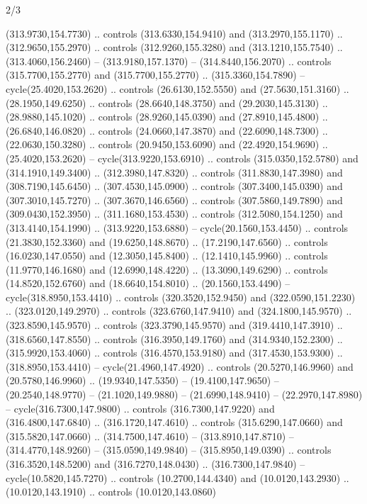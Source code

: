 \begin{flagdescription}{2/3}
\begin{scope}[xshift=0.5\flaglength,yshift=0.5\flagwidth,scale=\stretchfactor]
\begin{scope}[scale=0.001645\flagwidth,yshift=65mm,xshift=-63mm]
\begin{scope}[y=0.80pt, x=0.80pt, yscale=-1,]
\begin{scope}[cm={{1.33333,0.0,0.0,1.33333,(0.0,1e-05)}}]
  (313.9730,154.7730) .. controls (313.6330,154.9410) and (313.2970,155.1170) ..
  (312.9650,155.2970) .. controls (312.9260,155.3280) and (313.1210,155.7540) ..
  (313.4060,156.2460) -- (313.9180,157.1370) -- (314.8440,156.2070) .. controls
  (315.7700,155.2770) and (315.7700,155.2770) .. (315.3360,154.7890) --
  cycle(25.4020,153.2620) .. controls (26.6130,152.5550) and (27.5630,151.3160)
  .. (28.1950,149.6250) .. controls (28.6640,148.3750) and (29.2030,145.3130) ..
  (28.9880,145.1020) .. controls (28.9260,145.0390) and (27.8910,145.4800) ..
  (26.6840,146.0820) .. controls (24.0660,147.3870) and (22.6090,148.7300) ..
  (22.0630,150.3280) .. controls (20.9450,153.6090) and (22.4920,154.9690) ..
  (25.4020,153.2620) -- cycle(313.9220,153.6910) .. controls (315.0350,152.5780)
  and (314.1910,149.3400) .. (312.3980,147.8320) .. controls (311.8830,147.3980)
  and (308.7190,145.6450) .. (307.4530,145.0900) .. controls (307.3400,145.0390)
  and (307.3010,145.7270) .. (307.3670,146.6560) .. controls (307.5860,149.7890)
  and (309.0430,152.3950) .. (311.1680,153.4530) .. controls (312.5080,154.1250)
  and (313.4140,154.1990) .. (313.9220,153.6880) -- cycle(20.1560,153.4450) ..
  controls (21.3830,152.3360) and (19.6250,148.8670) .. (17.2190,147.6560) ..
  controls (16.0230,147.0550) and (12.3050,145.8400) .. (12.1410,145.9960) ..
  controls (11.9770,146.1680) and (12.6990,148.4220) .. (13.3090,149.6290) ..
  controls (14.8520,152.6760) and (18.6640,154.8010) .. (20.1560,153.4490) --
  cycle(318.8950,153.4410) .. controls (320.3520,152.9450) and
  (322.0590,151.2230) .. (323.0120,149.2970) .. controls (323.6760,147.9410) and
  (324.1800,145.9570) .. (323.8590,145.9570) .. controls (323.3790,145.9570) and
  (319.4410,147.3910) .. (318.6560,147.8550) .. controls (316.3950,149.1760) and
  (314.9340,152.2300) .. (315.9920,153.4060) .. controls (316.4570,153.9180) and
  (317.4530,153.9300) .. (318.8950,153.4410) -- cycle(21.4960,147.4920) ..
  controls (20.5270,146.9960) and (20.5780,146.9960) .. (19.9340,147.5350) --
  (19.4100,147.9650) -- (20.2540,148.9770) -- (21.1020,149.9880) --
  (21.6990,148.9410) -- (22.2970,147.8980) -- cycle(316.7300,147.9800) ..
  controls (316.7300,147.9220) and (316.4800,147.6840) .. (316.1720,147.4610) ..
  controls (315.6290,147.0660) and (315.5820,147.0660) .. (314.7500,147.4610) --
  (313.8910,147.8710) -- (314.4770,148.9260) -- (315.0590,149.9840) --
  (315.8950,149.0390) .. controls (316.3520,148.5200) and (316.7270,148.0430) ..
  (316.7300,147.9840) -- cycle(10.5820,145.7270) .. controls (10.2700,144.4340)
  and (10.0120,143.2930) .. (10.0120,143.1910) .. controls (10.0120,143.0860)

\end{scope}
\end{scope}
\end{scope}
\end{scope}
\end{flagdescription}
